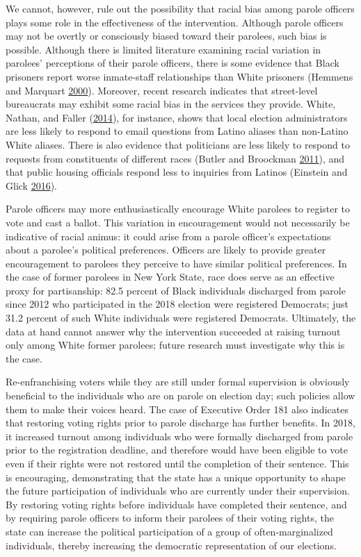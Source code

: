 \documentclass[
  12pt,
]{article}
\begin{document}
We cannot, however, rule out the possibility that racial bias among parole officers plays some role in the effectiveness of the intervention. Although parole officers may not be overtly or consciously biased toward their parolees, such bias is possible. Although there is limited literature examining racial variation in parolees' perceptions of their parole officers, there is some evidence that Black prisoners report worse inmate-staff relationships than White prisoners (Hemmens and Marquart \protect\hyperlink{ref-Hemmens2000}{2000}). Moreover, recent research indicates that street-level bureaucrats may exhibit some racial bias in the services they provide. White, Nathan, and Faller (\protect\hyperlink{ref-WHITE2014}{2014}), for instance, shows that local election administrators are less likely to respond to email questions from Latino aliases than non-Latino White aliases. There is also evidence that politicians are less likely to respond to requests from constituents of different races (Butler and Broockman \protect\hyperlink{ref-Butler2011}{2011}), and that public housing officials respond less to inquiries from Latinos (Einstein and Glick \protect\hyperlink{ref-Einstein2016}{2016}).

Parole officers may more enthusiastically encourage White parolees to register to vote and cast a ballot. This variation in encouragement would not necessarily be indicative of racial animus: it could arise from a parole officer's expectations about a parolee's political preferences. Officers are likely to provide greater encouragement to parolees they perceive to have similar political preferences. In the case of former parolees in New York State, race does serve as an effective proxy for partisanship: 82.5 percent of Black individuals discharged from parole since 2012 who participated in the 2018 election were registered Democrats; just 31.2 percent of such White individuals were registered Democrats. Ultimately, the data at hand cannot answer why the intervention succeeded at raising turnout only among White former parolees; future research must investigate why this is the case.

Re-enfranchising voters while they are still under formal supervision is obviously beneficial to the individuals who are on parole on election day; such policies allow them to make their voices heard. The case of Executive Order 181 also indicates that restoring voting rights prior to parole discharge has further benefits. In 2018, it increased turnout among individuals who were formally discharged from parole prior to the registration deadline, and therefore would have been eligible to vote even if their rights were not restored until the completion of their sentence. This is encouraging, demonstrating that the state has a unique opportunity to shape the future participation of individuals who are currently under their supervision. By restoring voting rights before individuals have completed their sentence, and by requiring parole officers to inform their parolees of their voting rights, the state can increase the political participation of a group of often-marginalized individuals, thereby increasing the democratic representation of our elections.
\end{document}
